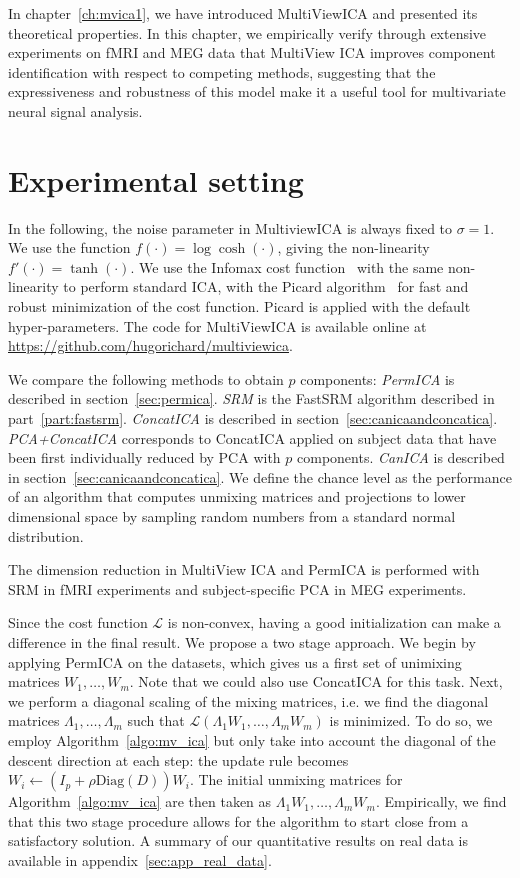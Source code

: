 In chapter~\ref{ch:mvica1}, we have introduced MultiViewICA and presented its
theoretical properties.
In this chapter, we empirically verify through extensive experiments on fMRI and
MEG data that MultiView ICA improves component identification with respect to competing methods, suggesting that the expressiveness and robustness of this model make it a useful tool for multivariate neural signal analysis.

\section{Experimental setting}
\label{sec:expts}
In the following, the noise parameter in MultiviewICA is always fixed to $\sigma =1$.
We use the function $f(\cdot)= \log\cosh(\cdot)$, giving the non-linearity $f'(\cdot) = \tanh(\cdot)$.
We use the Infomax cost function~\cite{bell1995information} with the same non-linearity to perform standard ICA, with the Picard algorithm~\cite{ablin2018faster} for fast and robust minimization of the cost function. Picard is applied with the default hyper-parameters.
The code for MultiViewICA is available online at \url{https://github.com/hugorichard/multiviewica}.
%

We compare the following methods to obtain $p$ components:
\emph{PermICA} is described in section~\ref{sec:permica}.
%
\emph{SRM} is the FastSRM algorithm described in part~\ref{part:fastsrm}.
%
\emph{ConcatICA} is described in section~\ref{sec:canicaandconcatica}.
%
\emph{PCA+ConcatICA} corresponds to ConcatICA applied on subject data that have been first individually reduced by PCA with $p$ components. 
%
\emph{CanICA} is described in section~\ref{sec:canicaandconcatica}.
We define the chance level as the performance of an algorithm that computes unmixing matrices and projections to lower dimensional space by sampling random numbers from a standard normal distribution. 
% 


The dimension reduction in MultiView ICA and PermICA is performed with SRM in
fMRI experiments and subject-specific PCA in MEG experiments.

Since the cost function $\mathcal{L}$ is non-convex, having a good initialization can make a difference in the final result. We propose a two stage approach.
We begin by applying PermICA on the datasets, which gives us a first set of unimixing matrices $W_1, \dots, W_m$.
Note that we could also use ConcatICA for this task.
Next, we perform a diagonal scaling of the mixing matrices, i.e. we find the diagonal matrices $\Lambda_1, \dots, \Lambda_m$ such that $\mathcal{L}(\Lambda_1W_1, \dots, \Lambda_mW_m)$ is minimized.
To do so, we employ Algorithm~\ref{algo:mv_ica} but only take into account the diagonal of the descent direction at each step: the update rule becomes $W_i \leftarrow (I_p + \rho \text{Diag}(D))W_i$.
The initial unmixing matrices for Algorithm~\ref{algo:mv_ica} are then taken as $\Lambda_1W_1, \dots, \Lambda_mW_m$.
Empirically, we find that this two stage procedure allows for the algorithm to start close from a satisfactory solution.
A summary of our quantitative results on real data is available in appendix~\ref{sec:app_real_data}.


